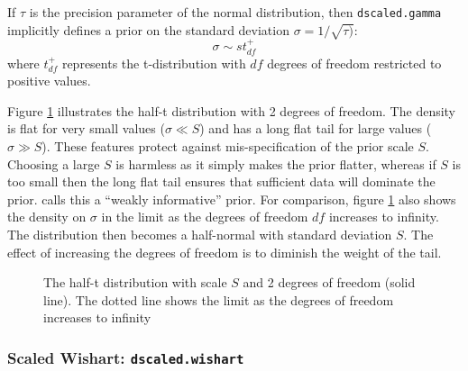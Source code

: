 \documentclass[11pt, a4paper, titlepage]{report}
\begin{document}
If $\tau$ is the precision parameter of the normal distribution, then
\texttt{dscaled.gamma} implicitly defines a prior on the standard
deviation $\sigma = 1/\sqrt{\tau)}$:
\[
\sigma \sim s t_{df}^{+}
\]
where $t_{df}^{+}$ represents the t-distribution with $df$ degrees of
freedom restricted to positive values.

Figure \ref{figure:halft} illustrates the half-t distribution with 2
degrees of freedom. The density is flat for very small values ($\sigma
\ll S$) and has a long flat tail for large values ($\sigma \gg
S$). These features protect against mis-specification of the prior
scale $S$.  Choosing a large $S$ is harmless as it simply makes the
prior flatter, whereas if $S$ is too small then the long flat tail
ensures that sufficient data will dominate the
prior. \citet{Gelman2006} calls this a ``weakly informative''
prior. For comparison, figure \ref{figure:halft} also shows the
density on $\sigma$ in the limit as the degrees of freedom $df$
increases to infinity. The distribution then becomes a half-normal
with standard deviation $S$. The effect of increasing the degrees of
freedom is to diminish the weight of the tail.

\begin{figure}
\caption{The half-t distribution with scale $S$ and 2 degrees of
  freedom (solid line). The dotted line shows the limit as the
  degrees of freedom increases to infinity \label{figure:halft}}
\end{figure}

\subsubsection{Scaled Wishart: \texttt{dscaled.wishart}}
\end{document}
